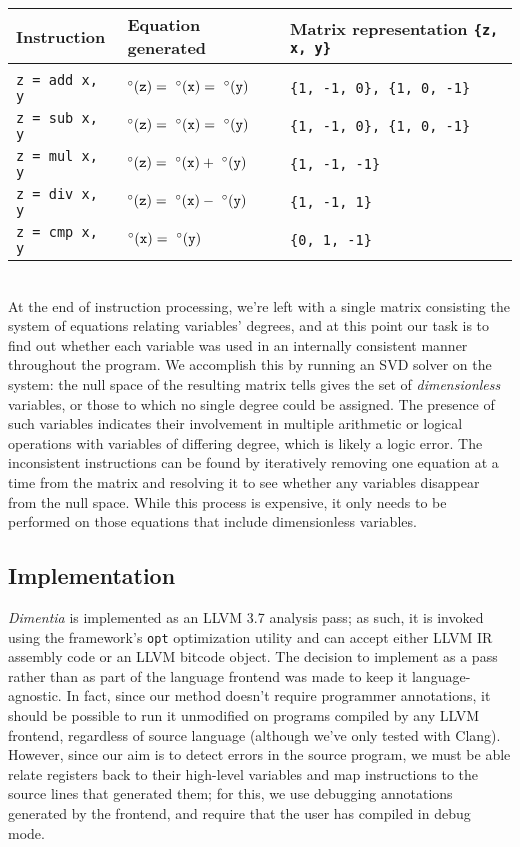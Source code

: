 \documentclass[12pt]{article}
\begin{document}
\begin{tabular}{l l l}
\textbf{Instruction} & \textbf{Equation generated} & \textbf{Matrix representation \texttt{\{z, x, y\}}} \\
\hline \\
\texttt{z = add x, y} & $\degree(\tt{z}) =\ \degree(\tt{x}) =\ \degree(\tt{y})$ & \texttt{\{1, -1, 0\}, \{1, 0, -1\}}\\
\texttt{z = sub x, y} & $\degree(\tt{z}) =\ \degree(\tt{x}) =\ \degree(\tt{y})$ & \texttt{\{1, -1, 0\}, \{1, 0, -1\}}\\
\texttt{z = mul x, y} & $\degree(\tt{z}) =\ \degree(\tt{x}) +\ \degree(\tt{y})$ & \texttt{\{1, -1, -1\}} \\
\texttt{z = div x, y} & $\degree(\tt{z}) =\ \degree(\tt{x}) -\ \degree(\tt{y})$ & \texttt{\{1, -1, 1\}} \\
\texttt{z = cmp x, y} & $\degree(\tt{x}) =\ \degree(\tt{y})$ & \texttt{\{0, 1, -1\}} \\
\end{tabular}
\\

\noindent
At the end of instruction processing, we're left with a single matrix consisting the system of equations relating variables' degrees, and at this point our task is to find out whether each variable was used in an internally consistent manner throughout the program.
We accomplish this by running an SVD solver on the system: the null space of the resulting matrix tells gives the set of \textit{dimensionless} variables, or those to which no single degree could be assigned.
The presence of such variables indicates their involvement in multiple arithmetic or logical operations with variables of differing degree, which is likely a logic error.
The inconsistent instructions can be found by iteratively removing one equation at a time from the matrix and resolving it to see whether any variables disappear from the null space.
While this process is expensive, it only needs to be performed on those equations that include dimensionless variables.

\subsection{Implementation}

\textit{Dimentia} is implemented as an LLVM 3.7 analysis pass; as such, it is invoked using the framework's \texttt{opt} optimization utility and can accept either LLVM IR assembly code or an LLVM bitcode object.
The decision to implement as a pass rather than as part of the language frontend was made to keep it language-agnostic.
In fact, since our method doesn't require programmer annotations, it should be possible to run it unmodified on programs compiled by any LLVM frontend, regardless of source language (although we've only tested with Clang).
However, since our aim is to detect errors in the source program, we must be able relate registers back to their high-level variables and map instructions to the source lines that generated them; for this, we use debugging annotations generated by the frontend, and require that the user has compiled in debug mode.
\end{document}
